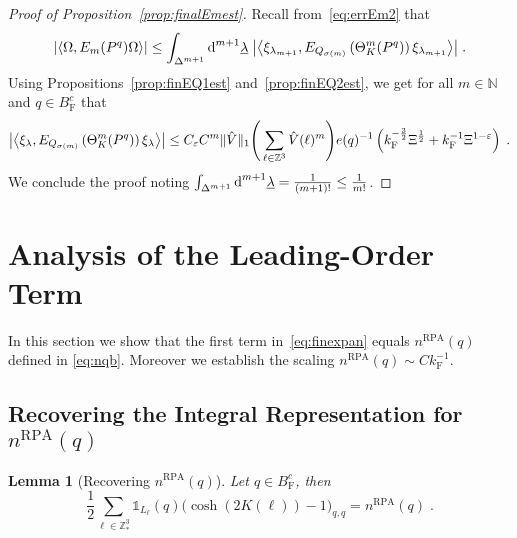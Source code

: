 \documentclass[12pt,a4paper]{article}
\numberwithin{equation}{section}
\newcommand{\1}{\mathbb{I}}
\newcommand{\di}{\textnormal{d}}
\newcommand{\F}{\mathrm{F}}
\newcommand{\RPA}{\mathrm{RPA}}
\newcommand{\Z}{\mathbb{Z}}
\newcommand{\half}{\frac{1}{2}}
\newcommand{\eva}[1]{\left\langle #1 \right\rangle}
\theoremstyle{plain}
\newtheorem{lemma}[theorem]{Lemma}
\theoremstyle{definition}
\theoremstyle{remark}
\theoremstyle{plain}
\theoremstyle{definition}
\theoremstyle{remark}
\begin{document}
\begin{proof}[Proof of Proposition~\ref{prop:finalEmest}]
Recall from~\eqref{eq:errEm2} that
\begin{equation}
	\abs{\eva{\Omega, E_m(P^q) \Omega }}
	\le \int_{\Delta^{m+1}} \di^{m+1}\underline{\lambda} \;
		\abs{\eva{\xi_{\lambda_{m+1}}, E_{Q_{\sigma(m)}}\left(\Theta^{m}_{K}(P^q)\right) \xi_{\lambda_{m+1}}}} \;.
\end{equation}		
Using Propositions~\ref{prop:finEQ1est} and~\ref{prop:finEQ2est}, we get for all $ m \in \mathbb{N} $ and $ q \in B_{\F}^c $ that
\begin{equation}
	\abs{\eva{\xi_\lambda, E_{Q_{\sigma(m)}}\left(\Theta^{m}_{K}(P^q)\right) \xi_\lambda}}
	\le C_\varepsilon C^m \Vert \hat{V} \Vert_1
		\Bigg( \sum_{\ell \in \Z^3} \hat{V}(\ell)^m \Bigg)
		e(q)^{-1} \left( k_{\F}^{-\frac{3}{2}} \Xi^\half
		+ k_{\F}^{-1}\Xi^{1-\varepsilon} \right) \;.
\end{equation}
We conclude the proof noting $ \int_{\Delta^{m+1}} \di^{m+1} \underline{\lambda} = \frac{1}{(m+1)!} \le \frac{1}{m!} $.
\end{proof}



\section{Analysis of the Leading-Order Term}
\label{sec:leading_order_analysis}


In this section we show that the first term in~\eqref{eq:finexpan} equals $ n^{\RPA}(q) $ defined in \eqref{eq:nqb}. Moreover we establish the scaling $ n^{\RPA}(q) \sim C k_{\F}^{-1} $.


\subsection{Recovering the Integral Representation for $ n^{\RPA}(q) $}\label{subsec:integralrep}

\begin{lemma}[Recovering $ n^{\RPA}(q) $] \label{lem:nqb_integralrecovery}
Let $q \in B^c_{\F}$, then
\begin{equation} \label{eq:nqb_integralrecovery}
	\half\sum_{\ell\in \Z^3_*}\mathds{1}_{L_\ell}(q) \big( \cosh(2K(\ell)) - 1 \big)_{q,q} = n^{\RPA}(q)\;.
\end{equation}
\end{lemma}
\end{document}
